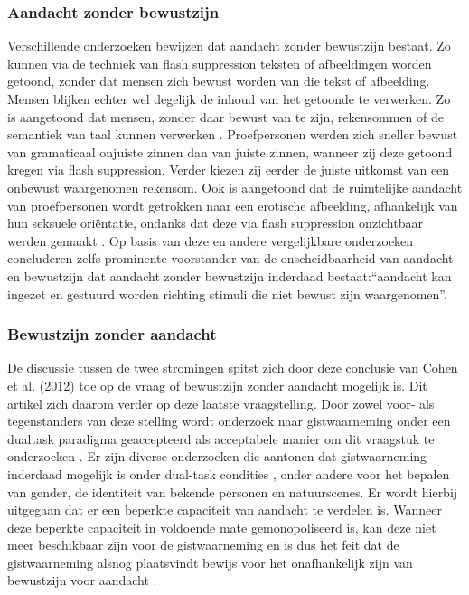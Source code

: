 \documentclass[a4paper,jou]{apa6}  %
\begin{document}
\subsubsection{Aandacht zonder bewustzijn}
Verschillende onderzoeken bewijzen dat aandacht zonder bewustzijn bestaat. Zo kunnen via de techniek van flash suppression teksten of afbeeldingen worden getoond, zonder dat mensen zich bewust worden van die tekst of afbeelding. Mensen blijken echter wel degelijk de inhoud van het getoonde te verwerken. Zo is aangetoond dat mensen, zonder daar bewust van te zijn, rekensommen of de semantiek van taal kunnen verwerken \cite{Sklar_Levy_Goldstein_Mandel_Maril_Hassin_2012}. Proefpersonen werden zich sneller bewust van gramaticaal onjuiste zinnen dan van juiste zinnen, wanneer zij deze getoond kregen via flash suppression. Verder kiezen zij eerder de juiste uitkomst van een onbewust waargenomen rekensom. Ook is aangetoond dat de ruimtelijke aandacht van proefpersonen wordt getrokken naar een erotische afbeelding, afhankelijk van hun seksuele oriëntatie, ondanks dat deze via flash suppression onzichtbaar werden gemaakt \cite{Jiang_Costello_Fang_Huang_He_2006}. Op basis van deze en andere vergelijkbare onderzoeken concluderen zelfs prominente voorstander van de onscheidbaarheid van aandacht en bewustzijn dat aandacht zonder bewustzijn inderdaad bestaat:“aandacht kan ingezet en gestuurd worden richting stimuli die niet bewust zijn waargenomen”\cite{Cohen_Cavanagh_Chun_Nakayama_2012}.
\subsubsection{Bewustzijn zonder aandacht}
De discussie tussen de twee stromingen spitst zich door deze conclusie van Cohen et al. (2012) toe op de vraag of bewustzijn zonder aandacht mogelijk is. Dit artikel zich daarom verder op deze laatste vraagstelling.
Door zowel voor- als tegenstanders van deze stelling wordt onderzoek naar gistwaarneming onder een dualtask paradigma geaccepteerd als acceptabele manier om dit vraagstuk te onderzoeken \cite{Block_2011,Cohen_Cavanagh_Chun_Nakayama_2012}. Er zijn diverse onderzoeken die aantonen dat gistwaarneming inderdaad mogelijk is onder dual-task condities \cite{LiVanRullenKochPerona2002,Reddy_Reddy_Koch_2006,VanBoxtel_Tsuchiya_Koch_2010,oliva2006building}, onder andere voor het bepalen van gender, de identiteit van bekende personen en natuurscenes. Er wordt hierbij uitgegaan dat er een beperkte capaciteit van aandacht te verdelen is. Wanneer deze beperkte capaciteit in voldoende mate gemonopoliseerd is, kan deze niet meer beschikbaar zijn voor de gistwaarneming en is dus het feit dat de gistwaarneming alsnog plaatsvindt bewijs voor het onafhankelijk zijn van bewustzijn voor aandacht \cite{Mack_Clarke_2012,Cohen_Cavanagh_Chun_Nakayama_2012}. 
\end{document}
